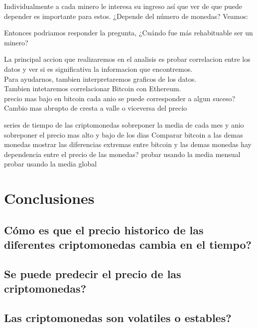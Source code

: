 \documentclass[12pt,letterpaper]{article}
\begin{document}

    Individualmente a cada minero le interesa su ingreso así que ver de que puede depender es importante para estos. ¿Depende del número de monedas? Veamos:


    
    Entonces podriamos responder la pregunta, ¿Cuándo fue más rehabituable ser un minero?








    La principal accion que realizaremos en el analisis es probar correlacion entre los datos y ver si es significativa la informacion que encontremos.
    \\
    Para ayudarnos, tambien interpretaremos graficos de los datos.
    \\
    Tambien intetaremos correlacionar Bitcoin con Ethereum.
    \\
    precio mas bajo en bitcoin cada anio
        se puede corresponder a algun suceso?
    Cambio mas abrupto de cresta a valle o viceversa del precio

    series de tiempo de las criptomonedas
        sobreponer la media de cada mes y anio
    sobreponer el precio mas alto y bajo de los dias
    Comparar bitcoin a las demas monedas
        mostrar las diferencias extremas entre bitcoin y las demas monedas
    hay dependencia entre el precio de las monedas?
        probar usando la media mensual
        probar usando la media global

\section*{Conclusiones}

	\subsection*{C\'omo es que el precio historico de las diferentes criptomonedas cambia en el tiempo?}
	\subsection*{Se puede predecir el precio de las criptomonedas?}
	\subsection*{Las criptomonedas son volatiles o estables?}
\end{document}
